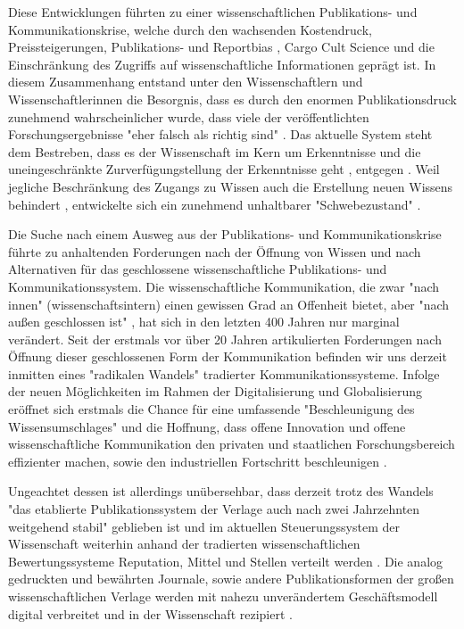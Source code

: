 Diese Entwicklungen führten zu einer wissenschaftlichen Publikations- und Kommunikationskrise, welche durch den wachsenden Kostendruck, Preissteigerungen, Publikations- \cite{Egger_1997} \cite{Fanelli_2012} und Reportbias \cite{Chan_2008} \cite{Dickersin_2011}, Cargo Cult Science \cite{Feynman_1974} und die Einschränkung des Zugriffs auf wissenschaftliche Informationen \cite{Hess_2006} geprägt ist. In diesem Zusammenhang entstand unter den Wissenschaftlern und Wissenschaftlerinnen die Besorgnis, dass es durch den enormen Publikationsdruck zunehmend wahrscheinlicher wurde, dass viele der veröffentlichten Forschungsergebnisse "eher falsch als richtig sind" \cite{Ioannidis_2005}. Das aktuelle System steht dem Bestreben, dass es der Wissenschaft im Kern um Erkenntnisse und die uneingeschränkte Zurverfügungstellung der Erkenntnisse geht \cite{hanekop_2006}, entgegen \cite{offhaus_2012_institutionelle_repos}. Weil jegliche Beschränkung des Zugangs zu Wissen auch die Erstellung neuen Wissens behindert \cite{cite:5} \cite{cite:8} \cite{Luhmann1998}, entwickelte sich ein zunehmend unhaltbarer "Schwebezustand" \cite{suchen}.

Die Suche nach einem Ausweg aus der Publikations- und Kommunikationskrise führte zu anhaltenden Forderungen nach der Öffnung von Wissen und nach Alternativen für das geschlossene wissenschaftliche Publikations- und Kommunikationssystem. Die wissenschaftliche Kommunikation, die zwar "nach innen" (wissenschaftsintern) einen gewissen Grad an Offenheit bietet, aber "nach außen geschlossen ist" \cite{kelty_2004}, hat sich in den letzten 400 Jahren nur marginal verändert. Seit der erstmals vor über 20 Jahren artikulierten Forderungen nach Öffnung dieser geschlossenen Form der Kommunikation befinden wir uns derzeit inmitten eines "radikalen Wandels" \cite{poynder_2011_suber} tradierter Kommunikationssysteme. Infolge der neuen Möglichkeiten im Rahmen der Digitalisierung und Globalisierung \cite{mcluhan_1963_gutenberg} eröffnet sich erstmals die Chance für eine umfassende "Beschleunigung des Wissensumschlages" \cite{Wenzel_2003} und die Hoffnung, dass offene Innovation und offene wissenschaftliche Kommunikation den privaten und staatlichen Forschungsbereich effizienter machen, sowie den industriellen Fortschritt beschleunigen \cite{cite:7}.

Ungeachtet dessen ist allerdings unübersehbar, dass derzeit trotz des Wandels "das etablierte Publikationssystem der Verlage auch nach zwei Jahrzehnten weitgehend stabil" \cite{Hanekop_2014} geblieben ist und im aktuellen Steuerungssystem der Wissenschaft weiterhin anhand der tradierten wissenschaftlichen Bewertungssysteme Reputation, Mittel und Stellen verteilt werden \cite{cite:4}. Die analog gedruckten und bewährten Journale, sowie andere Publikationsformen der großen wissenschaftlichen Verlage werden mit nahezu unverändertem Geschäftsmodell digital verbreitet \cite{Hanekop_2014} \cite{boai_2012} und in der Wissenschaft rezipiert \cite{suchen}.

